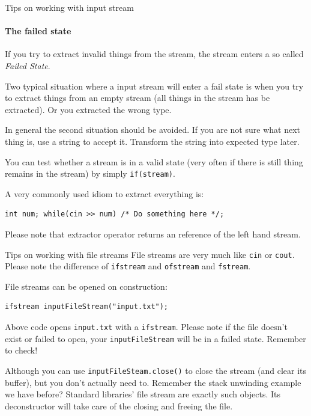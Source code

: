 \begin{frame}[fragile]{Tips on working with input stream}
\framesubtitle{The failed state}
If you try to extract invalid things from the stream, the stream enters a so called \textit{Failed State}. 

Two typical situation where a input stream will enter a fail state is when you try to extract things from an empty stream (all things in the stream has be extracted). Or you extracted the wrong type.

In general the second situation should be avoided. If you are not sure what next thing is, use a string to accept it. Transform the string into expected type later.

You can test whether a stream is in a valid state (very often if there is still thing remains in the stream) by simply \texttt{if(stream)}.

A very commonly used idiom to extract everything is:

\begin{verbatim}
int num; while(cin >> num) /* Do something here */;
\end{verbatim}

Please note that extractor operator returns an reference of the left hand stream.
\end{frame}

\begin{frame}[fragile]{Tips on working with file streams}
File streams are very much like \texttt{cin} or \texttt{cout}. Please note the difference of \texttt{ifstream} and \texttt{ofstream} and \texttt{fstream}. 

File streams can be opened on construction:
\begin{verbatim}
ifstream inputFileStream("input.txt");
\end{verbatim}
Above code opens \texttt{input.txt} with a \texttt{ifstream}. Please note if the file doesn't exist or failed to open, your \texttt{inputFileStream} will be in a failed state. Remember to check!

Although you can use \texttt{inputFileSteam.close()} to close the stream (and clear its buffer), but you don't actually need to. Remember the stack unwinding example we have before? Standard libraries' file stream are exactly such objects. Its deconstructor will take care of the closing and freeing the file.

\end{frame}

